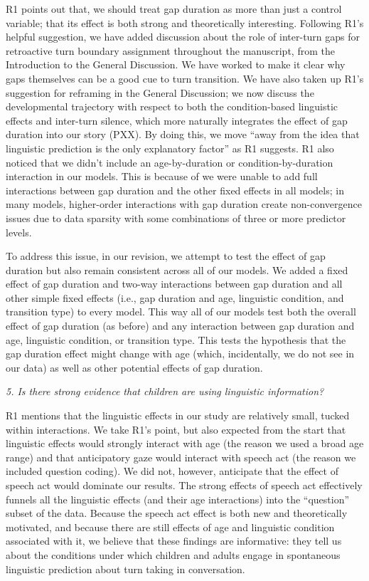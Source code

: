 \documentclass[11pt,a4paper]{letter} %
\begin{document}
\begin{letter}{}
\noindent R1 points out that, we should treat gap duration as more than just a control variable; that its effect is both strong and theoretically interesting. Following R1's helpful suggestion, we have added discussion about the role of inter-turn gaps for retroactive turn boundary assignment throughout the manuscript, from the Introduction to the General Discussion. We have worked to make it clear why gaps themselves can be a good cue to turn transition. We have also taken up R1's suggestion for reframing in the General Discussion; we now discuss the developmental trajectory with respect to both the condition-based linguistic effects and inter-turn silence, which more naturally integrates the effect of gap duration into our story (PXX). By doing this, we move ``away from the idea that linguistic prediction is the only explanatory factor'' as R1 suggests. R1 also noticed that we didn't include an age-by-duration or condition-by-duration interaction in our models. This is because of we were unable to add full interactions between gap duration and the other fixed effects in all models; in many models, higher-order interactions with gap duration create non-convergence issues due to data sparsity with some combinations of three or more predictor levels.

\noindent To address this issue, in our revision, we attempt to test the effect of gap duration but also remain consistent across all of our models. We added a fixed effect of gap duration and two-way interactions between gap duration and all other simple fixed effects (i.e., gap duration and age, linguistic condition, and transition type) to every model. This way all of our models test both the overall effect of gap duration (as before) and any interaction between gap duration and age, linguistic condition, or transition type. This tests the hypothesis that the gap duration effect might change with age (which, incidentally, we do not see in our data) as well as other potential effects of gap duration.

\noindent \textit{5. Is there strong evidence that children are using linguistic information?}

\noindent R1 mentions that the linguistic effects in our study are relatively small, tucked within interactions. We take R1's point, but also expected from the start that linguistic effects would strongly interact with age (the reason we used a broad age range) and that anticipatory gaze would interact with speech act (the reason we included question coding). We did not, however, anticipate that the effect of speech act would dominate our results. The strong effects of speech act effectively funnels all the linguistic effects (and their age interactions) into the ``question'' subset of the data. Because the speech act effect is both new and theoretically motivated, and because there are still effects of age and linguistic condition associated with it, we believe that these findings are informative: they tell us about the conditions under which children and adults engage in spontaneous linguistic prediction about turn taking in conversation.


\end{letter}
\end{document}
